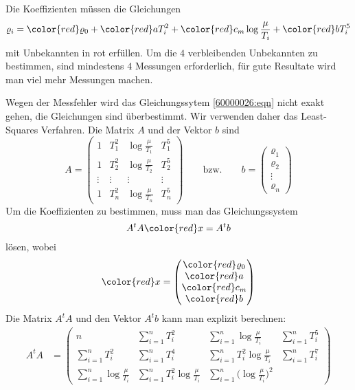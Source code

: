 \begin{loesung}
Die Koeffizienten müssen die Gleichungen
\begin{equation}
\varrho_i
=
{\color{red}\varrho_0}
+
{\color{red}a}T_i^2
+
{\color{red}c_m}\log\frac{\mu}{T_i}
+
{\color{red}b}T_i^5
\label{60000026:eqn}
\end{equation}
mit Unbekannten in {\color{red}rot} erfüllen.
Um die $4$ verbleibenden Unbekannten zu bestimmen, sind mindestens $4$
Messungen erforderlich, für gute Resultate wird man viel mehr Messungen
machen.

Wegen der Messfehler wird das Gleichungssytem \eqref{60000026:eqn}
nicht exakt gehen, die Gleichungen sind überbestimmt.
Wir verwenden daher das Least-Squares Verfahren.
Die Matrix $A$ und der Vektor $b$ sind
\[
A=
\begin{pmatrix}
1 & T_1^2 & \log\frac{\mu}{T_1} & T_1^5 \\
1 & T_2^2 & \log\frac{\mu}{T_2} & T_2^5 \\
\vdots&\vdots&\vdots&\vdots \\
1 & T_n^2 & \log\frac{\mu}{T_n} & T_n^5 
\end{pmatrix}
\qquad
\text{bzw.}
\qquad
b=
\begin{pmatrix}
\varrho_1\\
\varrho_2\\
\vdots\\
\varrho_n
\end{pmatrix}
\]
Um die Koeffizienten zu bestimmen, muss man das Gleichungssystem
\[
A^tA {\color{red}x} = A^tb
\]
lösen, wobei 
\[
{\color{red}x}
=
\begin{pmatrix}
{\color{red}\varrho_0}\\
{\color{red}a}\\
{\color{red}c_m}\\
{\color{red}b}
\end{pmatrix}
\]
Die Matrix $A^tA$ und den Vektor $A^tb$ kann man explizit berechnen:
\begin{align*}
A^tA
&=
\begin{pmatrix}
n
	&\displaystyle\sum_{i=1}^n T_i^2
		&\displaystyle\sum_{i=1}^n \log\frac{\mu}{T_i}
			&\displaystyle\sum_{i=1}^n T_i^5
\\
\displaystyle\sum_{i=1}^n T_i^2
	&\displaystyle \sum_{i=1}^n T_i^4
		&\displaystyle \sum_{i=1}^n T_i^2\log\frac{\mu}{T_i}
			&\displaystyle \sum_{i=1}^n T_i^7
\\
\displaystyle\sum_{i=1}^n \log\frac{\mu}{T_i}
	&\displaystyle \sum_{i=1}^n T_i^2\log\frac{\mu}{T_i}
		&\displaystyle \sum_{i=1}^n \biggl(\log\frac{\mu}{T_i}\biggr)^2

\end{pmatrix}
\end{align*}
\end{loesung}
